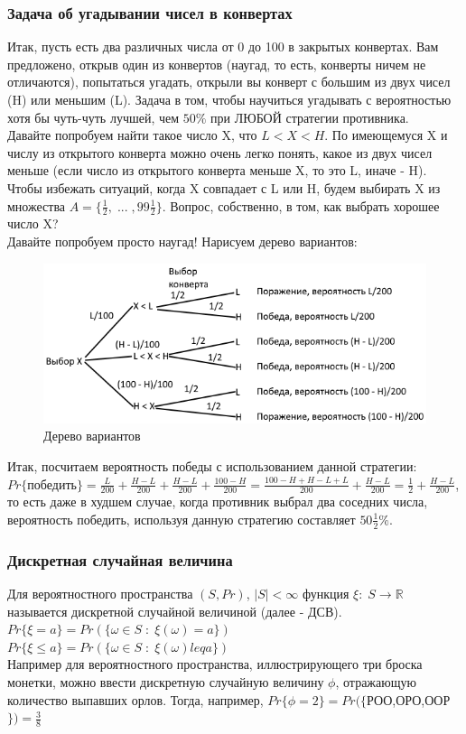 \subsubsection{Задача об угадывании чисел в конвертах}
Итак, пусть есть два различных числа от 0 до 100 в закрытых конвертах. Вам предложено, открыв один из конвертов (наугад, то есть, конверты ничем не отличаются), попытаться угадать, открыли вы конверт с большим из двух чисел (H) или меньшим (L). Задача в том, чтобы научиться угадывать с вероятностью хотя бы чуть-чуть лучшей, чем $50\%$ при ЛЮБОЙ стратегии противника.\\
Давайте попробуем найти такое число X, что $L < X < H$. По имеющемуся X и числу из открытого конверта можно очень легко понять, какое из двух чисел меньше (если число из открытого конверта меньше X, то это L, иначе - H).\\
Чтобы избежать ситуаций, когда X совпадает с L или H, будем выбирать X из множества $A = \{\frac{1}{2}, \; ... \; , 99\frac{1}{2}\}$. Вопрос, собственно, в том, как выбрать хорошее число X?\\
Давайте попробуем просто наугад! Нарисуем дерево вариантов:\\
\begin{figure}
\includegraphics[width=\linewidth]{Envelopes.png}
\caption{Дерево вариантов}
\label{fig:Envelopes}
\end{figure}
Итак, посчитаем вероятность победы с использованием данной стратегии:\\
$Pr\{$победить$\} = \frac{L}{200} + \frac{H - L}{200} + \frac{H - L}{200} + \frac{100 - H}{200} = \frac{100 - H + H - L + L}{200} + \frac{H - L}{200} = \frac{1}{2} + \frac{H - L}{200}$,\\
то есть даже в худшем случае, когда противник выбрал два соседних числа, вероятность победить, используя данную стратегию составляет $50\frac{1}{2}\%$.
\subsubsection{Дискретная случайная величина}
Для вероятностного пространства $(S, Pr)$, $|S| < \infty$ функция $\xi: \; S \rightarrow \mathbb{R}$ называется дискретной случайной величиной (далее - ДСВ).\\
$Pr\{\xi = a\} = Pr(\{\omega \in S \; : \; \xi(\omega) = a\})$\\
$Pr\{\xi \leq a\} = Pr(\{\omega \in S \; : \; \xi(\omega) leq a\})$\\
Например для вероятностного пространства, иллюстрирующего три броска монетки, можно ввести дискретную случайную величину $\phi$, отражающую количество выпавших орлов. Тогда, например, $Pr\{\phi = 2\} = Pr(\{$РОО,ОРО,ООР$\}) = \frac{3}{8}$
